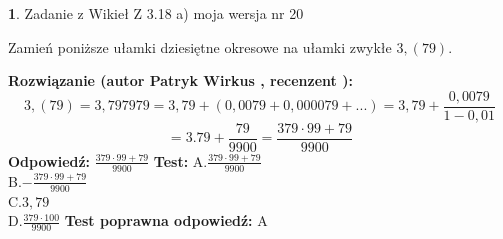\documentclass[12pt, a4paper]{article}
\theoremstyle{definition} %
\newtheorem{zad}{}
\newcommand{\zadStart}[1]{\begin{zad}#1\newline}
\newcommand{\zadStop}{\end{zad}}
\newcommand{\rozwStart}[2]{\noindent \textbf{Rozwiązanie (autor #1 , recenzent #2): }\newline}
\newcommand{\rozwStop}{\newline}
\newcommand{\odpStart}{\noindent \textbf{Odpowiedź:}\newline}
\newcommand{\odpStop}{\newline}
\newcommand{\testStart}{\noindent \textbf{Test:}\newline}
\newcommand{\testStop}{\newline}
\newcommand{\kluczStart}{\noindent \textbf{Test poprawna odpowiedź:}\newline}
\newcommand{\kluczStop}{\newline}
\begin{document}
\zadStart{Zadanie z Wikieł Z 3.18 a) moja wersja nr 20}

Zamień poniższe ułamki dziesiętne okresowe na ułamki zwykłe $3,(79)$.
\zadStop
\rozwStart{Patryk Wirkus}{}
$$3,(79)=3,797979=3,79+(0,0079+0,000079+...)=3,79+\frac{0,0079}{1-0,01}$$
$$=3.79+\frac{79}{9900}=\frac{379\cdot99+79}{9900}$$
\rozwStop
\odpStart
$\frac{379\cdot99+79}{9900}$
\odpStop
\testStart
A.$\frac{379\cdot99+79}{9900}$\\ B.$-\frac{379\cdot99+79}{9900}$\\ C.$3,79$\\ D.$\frac{379\cdot100}{9900}$
\testStop
\kluczStart
A
\kluczStop
\end{document}
